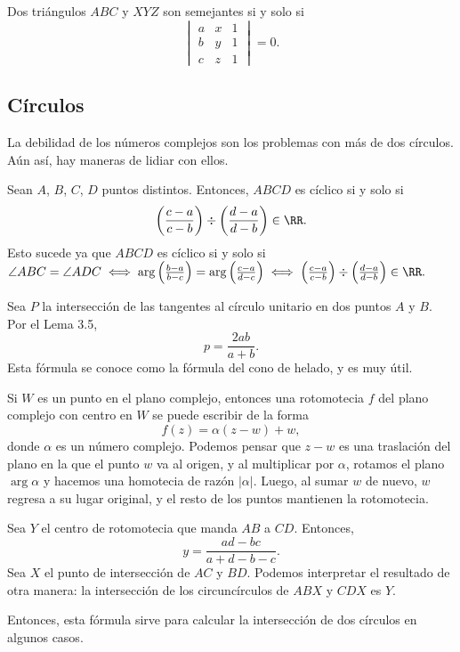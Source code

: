 \documentclass[11pt]{scrartcl}
\begin{document}
\begin{lemma}[Semejanza]
Dos triángulos $ABC$ y $XYZ$ son semejantes si y solo si
\[\begin{vmatrix}a & x & 1\\b & y & 1\\ c & z & 1\end{vmatrix} = 0.\]
\end{lemma}

\subsection{Círculos}

La debilidad de los números complejos son los problemas con más de dos círculos. Aún así, hay maneras de lidiar con ellos.
\begin{lemma}[Cíclicos]
Sean $A$, $B$, $C$, $D$ puntos distintos. Entonces, $ABCD$ es cíclico si y solo si 
\[\left(\frac{c-a}{c-b}\right)\div\left(\frac{d-a}{d-b}\right)\in \RR.\]
Esto sucede ya que $ABCD$ es cíclico si y solo si $\angle{ABC} = \angle{ADC} \iff \arg\left(\frac{b-a}{b-c}\right)=\arg\left(\frac{c-a}{d-c}\right)\iff \left(\frac{c-a}{c-b}\right)\div\left(\frac{d-a}{d-b}\right)\in \RR.$
\end{lemma}

\begin{lemma}
Sea $P$ la intersección de las tangentes al círculo unitario en dos puntos $A$ y $B$. Por el Lema 3.5, 
\[p = \frac{2ab}{a+b}.\]
Esta fórmula se conoce como la fórmula del cono de helado, y es muy útil.
\end{lemma}

\begin{lemma}[Rotomotecia]
    Si $W$ es un punto en el plano complejo, entonces una rotomotecia $f$ del plano complejo con centro en $W$ se puede escribir de la forma 
    \[f(z) = \alpha(z-w)+w,\]
    donde $\alpha$ es un número complejo. Podemos pensar que $z-w$ es una traslación del plano en la que el punto $w$ va al origen, y al multiplicar por $\alpha$, rotamos el plano $\arg\alpha$ y hacemos una homotecia de razón $\lvert\alpha\rvert$. Luego, al sumar $w$ de nuevo, $w$ regresa a su lugar original, y el resto de los puntos mantienen la rotomotecia.
\end{lemma}

\begin{lemma}
    Sea $Y$ el centro de rotomotecia que manda $AB$ a $CD$. Entonces, 
    \[y = \frac{ad-bc}{a+d-b-c}.\]
    Sea $X$ el punto de intersección de $AC$ y $BD$. Podemos interpretar el resultado de otra manera: la intersección de los circuncírculos de $ABX$ y $CDX$ es $Y$.
    
    Entonces, esta fórmula sirve para calcular la intersección de dos círculos en algunos casos.
\end{lemma}
\end{document}
